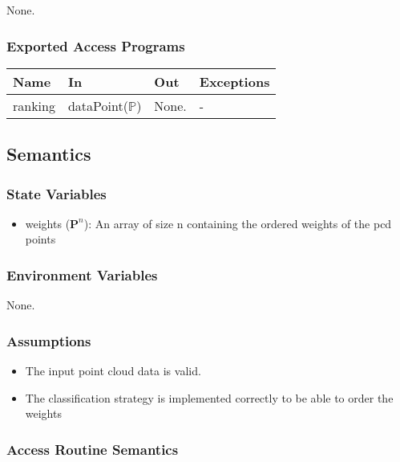 \documentclass[12pt, titlepage]{article}
\begin{document}
None.

\subsubsection{Exported Access Programs}

\begin{center}
\begin{tabular}{p{2cm} p{4cm} p{4cm} p{2cm}}
\hline
\textbf{Name} & \textbf{In} & \textbf{Out} & \textbf{Exceptions} \\
\hline
ranking & dataPoint($\mathbb{P}$)  & None. & - \\
\hline
\end{tabular}
\end{center}

\subsection{Semantics}

\subsubsection{State Variables}

\begin{itemize}
  \item weights ($\mathbf{P}^{n}$): An array of size n containing the ordered weights of the pcd points
\end{itemize}

\subsubsection{Environment Variables}

None.

\subsubsection{Assumptions}

\begin{itemize}
  \item The input point cloud data is valid.
  \item The classification strategy is implemented correctly to be able to order the weights
\end{itemize}

\subsubsection{Access Routine Semantics}
\end{document}
